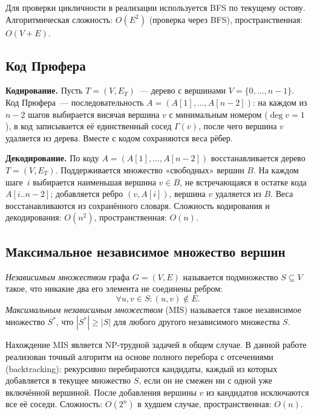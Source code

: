 Для проверки цикличности в реализации используется BFS по текущему остову.
Алгоритмическая сложность: $O(E^2)$ (проверка через BFS), пространственная: $O(V + E)$.

\subsection{Код Прюфера}

\textbf{Кодирование.} Пусть $T = (V, E_T)$~--- дерево с вершинами
$V = \{0, \ldots, n-1\}$. Код Прюфера~--- последовательность
$A = (A[1], \ldots, A[n-2])$: на каждом из $n - 2$ шагов выбирается
висячая вершина $v$ с минимальным номером ($\deg v = 1$), в код записывается
её единственный сосед $\Gamma(v)$, после чего вершина $v$ удаляется из дерева.
Вместе с кодом сохраняются веса рёбер.

\textbf{Декодирование.} По коду $A = (A[1], \ldots, A[n-2])$
восстанавливается дерево $T = (V, E_T)$. Поддерживается множество
«свободных» вершин $B$. На каждом шаге~$i$ выбирается наименьшая вершина
$v \in B$, не встречающаяся в остатке кода $A[i..n-2]$; добавляется ребро
$(v, A[i])$, вершина $v$ удаляется из $B$. Веса восстанавливаются из
сохранённого словаря. Сложность кодирования и декодирования: $O(n^2)$,
пространственная: $O(n)$.

\subsection{Максимальное независимое множество вершин}

\textit{Независимым множеством} графа $G = (V, E)$ называется подмножество
$S \subseteq V$ такое, что никакие два его элемента не соединены ребром:
\[
    \forall u, v \in S : (u, v) \notin E.
\]
\textit{Максимальным независимым множеством} (MIS) называется такое
независимое множество $S^*$, что $|S^*| \geq |S|$ для любого другого
независимого множества $S$.

Нахождение MIS является NP-трудной задачей в общем случае.
В данной работе реализован точный алгоритм на основе полного перебора
с отсечениями (backtracking): рекурсивно перебираются кандидаты,
каждый из которых добавляется в текущее множество $S$, если он
не смежен ни с одной уже включённой вершиной. После добавления
вершины $v$ из кандидатов исключаются все её соседи.
Сложность: $O(2^n)$ в худшем случае, пространственная: $O(n)$.

